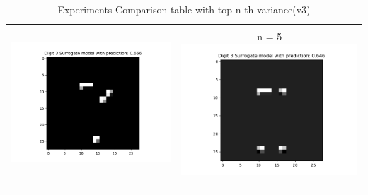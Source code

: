 \documentclass[12pt]{article}
\begin{document}
\begin{table}[H]
    \centering
    \caption{Experiments Comparison table with top n-th variance(v3)}
    \begin{tabular}{|c|c|}
        \hline
        
        \hline
        \begin{minipage}{0.45\linewidth}
            \centering

            n = 5 \\
            \includegraphics[width=\linewidth]{../fig/ID 3-Digit 8 pred 3 with n=5.png}
        \end{minipage} &
        \begin{minipage}{0.45\linewidth}
            \centering

            n = 5
            \includegraphics[width=\linewidth]{../fig/ID 3-Digit 8 pred 3 with n=5-1_1.png}
        \end{minipage} \\
        \\
        \hline
        \begin{minipage}{0.45\linewidth}
            \centering


\end{minipage}
\end{tabular}
\end{table}
\end{document}

